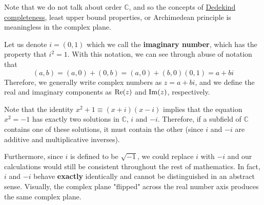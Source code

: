   Note that we do not talk about order $\mathbb{C}$, and so the concepts of \hyperref[real-def:dedekind-completeness]{Dedekind completeness}, least upper bound properties, or Archimedean principle is meaningless in the complex plane. 

  \begin{definition}
    \label{def:imaginary-number}
 
    Let us denote $i = (0, 1)$ which we call the \textbf{imaginary number}, which has the property that $i^2 = 1$. With this notation, we can see through abuse of notation that 
    \begin{equation}
      (a, b) = (a, 0) + (0, b) = (a, 0) + (b, 0) (0, 1) = a + bi
    \end{equation} 
    Therefore, we generally write complex numbers as $z = a + bi$, and we define the real and imaginary components as $\operatorname{Re}(z)$ and $\operatorname{Im}(z)$, respectively. 
  \end{definition}

  Note that the identity $x^2 + 1 \equiv (x + i) (x - i)$ implies that the equation $x^2 = -1$ has exactly two solutions in $\mathbb{C}$, $i$ and $-i$. Therefore, if a subfield of $\mathbb{C}$ contains one of these solutions, it must contain the other (since $i$ and $-i$ are additive and multiplicative inverses). 

  Furthermore, since $i$ is defined to be $\sqrt{-1}$, we could replace $i$ with $-i$ and our calculations would still be consistent throughout the rest of mathematics. In fact, $i$ and $-i$ behave \textbf{exactly} identically and cannot be distinguished in an abstract sense. Visually, the complex plane "flipped" across the real number axis produces the same complex plane. 

